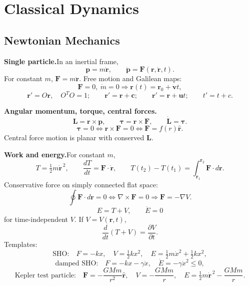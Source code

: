 \providecommand{\half}{\tfrac{1}{2}}

\section{Classical Dynamics}
\label{sec:classical-dynamics}

\subsection{Newtonian Mechanics}

\noindent\textbf{Single particle.}\quad In an inertial frame,
\[
\mathbf p=m\dot{\mathbf r},\qquad
\boxed{\dot{\mathbf p}=\mathbf F(\mathbf r,\dot{\mathbf r},t)}.
\]
For constant $m$, $\mathbf F=m\ddot{\mathbf r}$. Free motion and Galilean maps:
\[
\mathbf F=0,\ \dot m=0\Rightarrow \mathbf r(t)=\mathbf r_0+\mathbf v t,
\]
\[
\mathbf r'=O\mathbf r,\quad O^TO=1;\qquad
\mathbf r'=\mathbf r+\mathbf c;\qquad
\mathbf r'=\mathbf r+\mathbf u t;\qquad
t'=t+c.
\]

\noindent\textbf{Angular momentum, torque, central forces.}\quad
\[
\mathbf L=\mathbf r\times\mathbf p,\qquad
\boldsymbol\tau=\mathbf r\times\mathbf F,\qquad
\boxed{\dot{\mathbf L}=\boldsymbol\tau}.
\]
\[
\boldsymbol\tau=0
\Longleftrightarrow
\mathbf r\times\mathbf F=0
\Longleftrightarrow
\mathbf F=f(r)\hat{\mathbf r}.
\]
Central force motion is planar with conserved $\mathbf L$.

\noindent\textbf{Work and energy.}\quad For constant $m$,
\[
T=\half m\dot{\mathbf r}^{\,2},\qquad
\frac{dT}{dt}=\mathbf F\cdot\dot{\mathbf r},\qquad
T(t_2)-T(t_1)=\int_{\mathbf r_1}^{\mathbf r_2}\mathbf F\cdot d\mathbf r.
\]
Conservative force on simply connected flat space:
\[
\oint\mathbf F\cdot d\mathbf r=0
\Longleftrightarrow
\nabla\times\mathbf F=0
\Longrightarrow
\mathbf F=-\nabla V.
\]
\[
E=T+V,\qquad
\boxed{\dot E=0}
\]
for time-independent $V$. If $V=V(\mathbf r,t)$,
\[
\frac{d}{dt}(T+V)=\frac{\partial V}{\partial t}.
\]
Templates:
\[
\text{SHO:}\quad F=-kx,\quad V=\half kx^2,\quad
E=\half m\dot x^2+\half kx^2,
\]
\[
\text{damped SHO:}\quad F=-kx-\gamma\dot x,\quad
\dot E=-\gamma\dot x^2\le0,
\]
\[
\text{Kepler test particle:}\quad
\mathbf F=-\frac{GMm}{r^2}\hat{\mathbf r},\quad
V=-\frac{GMm}{r},\quad
E=\half m\dot{\mathbf r}^{\,2}-\frac{GMm}{r}.
\]

